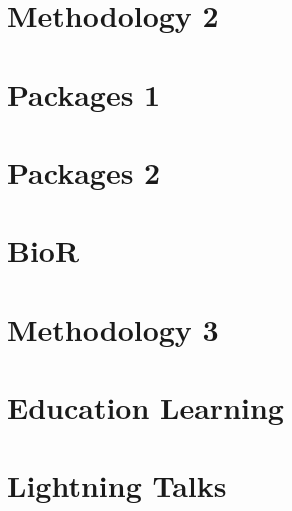 \documentclass[11pt,oneside]{book}
\begin{document}
\chapter{Methodology 2}





\chapter{Packages 1}


% 



\chapter{Packages 2}



% 


\chapter{BioR}






\chapter{Methodology 3}

% 



\chapter{Education Learning}





\chapter{Lightning Talks}





% 







\end{document}
